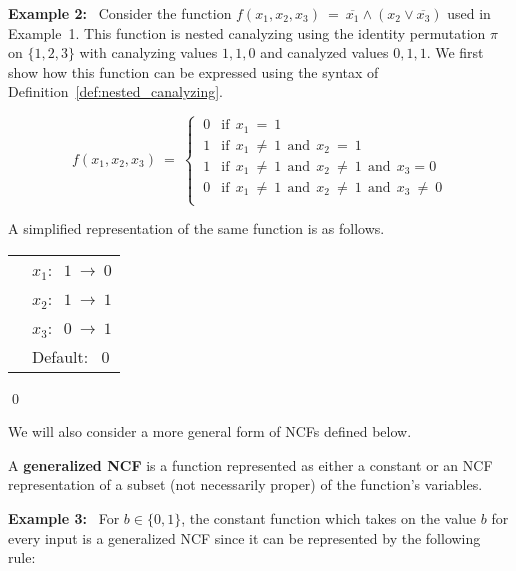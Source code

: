 \medskip
\noindent
\textbf{Example 2:}~ Consider the function 
$f(x_1, x_2, x_3) ~=~ \overline{x_1} \wedge (x_2 \vee \overline{x_3})$
used in Example~1.
This function is nested canalyzing using the identity permutation $\pi$ on $\{1,2,3\}$
with canalyzing values $1,1,0$ and canalyzed values $0, 1, 1$.
We first show how this function can be expressed using the syntax of
Definition~\ref{def:nested_canalyzing}.

\[
f(x_1, x_2, x_3) ~=~ 
   \begin{cases}
       \:0 & \mathrm{if~~} x_{1} ~=~ 1 \\
       \:1 & \mathrm{if~~} x_{1} ~\neq~ 1 \mathrm{~~and~~}
            x_{2} ~=~ 1 \\
       \:1 & \mathrm{if~~} x_{1} ~\neq~ 1 \mathrm{~~and~~}
            x_{2} ~\neq~ 1 \mathrm{~~and~~} x_{3} = 0 \\
       \:0 & \mathrm{if~~} x_{1} ~\neq~ 1 \mathrm{~~and~~}
            x_{2} ~\neq~ 1 \mathrm{~~and~~} x_{3} ~\neq~ 0 \\
   \end{cases}
\]

\medskip
\noindent
A simplified representation of the same function is as follows.

\bigskip

\noindent
\begin{tabular}{ll}
\hspace*{1.1in} & $x_1:~$  $1 ~\longrightarrow~ 0$ \\ [1ex]
\hspace*{1.1in} & $x_2:~$  $1 ~\longrightarrow~ 1$ \\ [1ex]
\hspace*{1.1in} & $x_3:~$  $0 ~\longrightarrow~ 1$ \\ [1ex]
\hspace*{1.1in} & Default:~ $0$ \\
\end{tabular}

\noindent
\qed

\noindent
We will also consider a more general form of NCFs defined below.

\begin{definition}\label{def:generalized ncf}
A {\bf generalized NCF} is a function represented as either a constant
or an NCF representation of a subset (not necessarily proper) 
of the function's variables.
\end{definition}

\noindent
\textbf{Example 3:}~ For $b \in \{0,1\}$, the constant function which takes 
on the value $b$ for every input is a generalized NCF since 
it can be represented by the following rule: 

